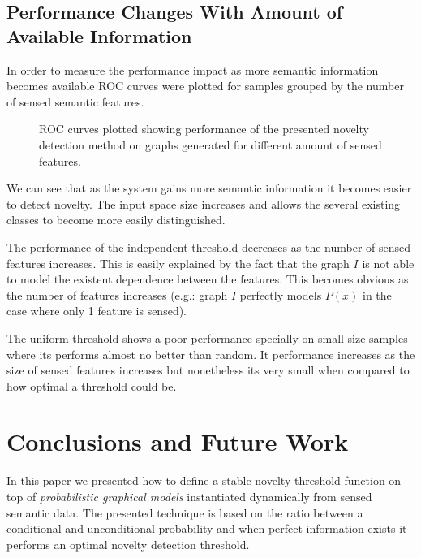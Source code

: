 \documentclass[runningheads,a4paper]{llncs}
\begin{document}
\subsection{Performance Changes With Amount of Available Information}
In order to measure the performance impact as more semantic information becomes
available ROC curves were plotted for samples grouped by the number of sensed
semantic features.

\begin{figure}[h]
\centering

\qquad
{}

\qquad
{}

\caption{\label{fig:synthetic-roc-breakdown}ROC curves plotted showing performance of the
         presented novelty detection method on graphs generated for different amount of
         sensed features.}
\end{figure}

We can see that as the system gains more semantic information it becomes easier
to detect novelty. The input space size increases and allows the several existing
classes to become more easily distinguished.

The performance of the independent threshold decreases as the number of sensed
features increases. This is easily explained by the fact that the graph $I$ is not
able to model the existent dependence between the features. This becomes obvious
as the number of features increases (e.g.: graph $I$ perfectly models $P(x)$ in the
case where only 1 feature is sensed).

The uniform threshold shows a poor performance specially on small size samples
where its performs almost no better than random.
It performance increases as the size of sensed features increases but nonetheless
its very small when compared to how optimal a threshold could be.


\section{Conclusions and Future Work}
In this paper we presented how to define a stable novelty threshold function on
top of \emph{probabilistic graphical models} instantiated dynamically from sensed
semantic data.
The presented technique is based on the ratio between a conditional and
unconditional probability and when perfect information exists it performs an optimal
novelty detection threshold.
\end{document}

